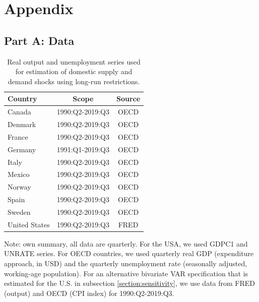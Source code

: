 \documentclass[12pt, a4paper]{article}
\begin{document}
\section*{Appendix}
\renewcommand{\thetable}{A\arabic{table}}
\renewcommand{\thefigure}{B\arabic{figure}}
\setcounter{figure}{0}
\setcounter{table}{0}
\subsection*{Part A: Data} \label{appendix:a}
\begin{table}[H]
\captionsetup{justification=raggedright, singlelinecheck=false}
    \centering
    \caption{Real output and unemployment series used for estimation of domestic supply and demand shocks using long-run restrictions.}
    \begin{tabular}{lcc}
    \toprule
       Country & Scope & Source  \\
    \midrule
       Canada  & 1990:Q2-2019:Q3 & OECD \\
       Denmark & 1990:Q2-2019:Q3 & OECD \\
       France  & 1990:Q2-2019:Q3 & OECD \\
       Germany & 1991:Q1-2019:Q3 & OECD \\
       Italy   & 1990:Q2-2019:Q3 & OECD \\
       Mexico  & 1990:Q2-2019:Q3 & OECD \\
       Norway  & 1990:Q2-2019:Q3 & OECD \\
       Spain   & 1990:Q2-2019:Q3 & OECD \\
       Sweden  & 1990:Q2-2019:Q3 & OECD \\
       United States & 1990:Q2-2019:Q3 & FRED \\
    \bottomrule 
    \end{tabular}
    \begin{minipage}{\textwidth}
    \vspace{0.1cm}
    \footnotesize Note: own summary, all data are quarterly. For the USA, we used GDPC1 and UNRATE series. For OECD countries, we used quarterly real GDP (expenditure approach, in USD) and the quarterly unemployment rate (seasonally adjusted, working-age population). For an alternative bivariate VAR specification that is estimated for the U.S. in subsection \ref{section:sensitivity}, we use data from FRED (output) and OECD (CPI index) for 1990:Q2-2019:Q3.
    \end{minipage}
    \label{table:a1}
\end{table}
\end{document}

